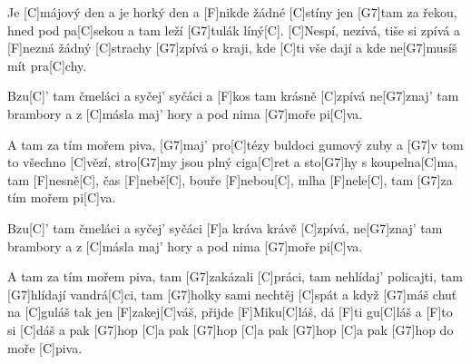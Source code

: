 
Je [C]májový den a je horký den a [F]nikde žádné [C]stíny
jen [G7]tam za řekou, hned pod pa[C]sekou a tam leží [G7]tulák líný[C].
[C]Nespí, nezívá, tiše si zpívá a [F]nezná žádný [C]strachy
[G7]zpívá o kraji, kde [C]ti vše dají a kde ne[G7]musíš mít pra[C]chy.

Bzu[C]' tam čmeláci a syčej' syčáci a [F]kos tam krásně [C]zpívá
ne[G7]znaj' tam brambory a z [C]másla maj' hory a pod nima [G7]moře pi[C]va.

A tam za tím mořem piva, [G7] maj' pro[C]tézy
buldoci gumový zuby a [G7]v tom to všechno [C]vězí,
stro[G7]my jsou plný ciga[C]ret a sto[G7]hy s koupelna[C]ma,
tam [F]nesně[C], čas [F]nebě[C], bouře [F]nebou[C], mlha [F]nele[C],
tam [G7]za tím mořem pi[C]va.

Bzu[C]' tam čmeláci a syčej' syčáci [F]a kráva krávě [C]zpívá,
ne[G7]znaj' tam brambory a z [C]másla maj' hory a pod nima [G7]moře pi[C]va.

A tam za tím mořem piva, tam [G7]zakázali [C]práci,
tam nehlídaj' policajti, tam [G7]hlídají vandrá[C]ci,
tam [G7]holky sami nechtěj [C]spát a když [G7]máš chuť na [C]guláš
tak jen [F]zakej[C]váš, přijde [F]Miku[C]láš, dá [F]ti gu[C]láš a [F]to si [C]dáš
a pak [G7]hop [C]a pak [G7]hop [C]a pak [G7]hop [C]a pak [G7]hop do moře [C]piva.